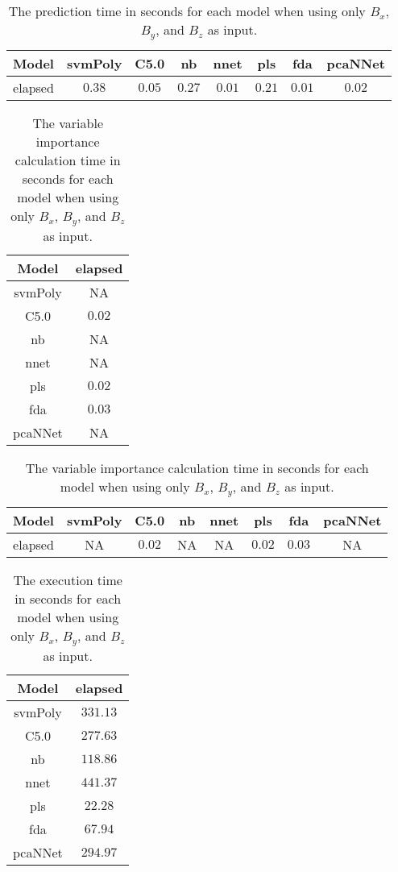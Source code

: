 \begin{table}[!ht]
	\centering
	\begin{tabular}{|c|c|c|c|c|c|c|c|}
		\hline
		Model & svmPoly & C5.0 & nb & nnet & pls & fda & pcaNNet \\ \hline
		elapsed & $0.38$ & $0.05$ & $0.27$ & $0.01$ & $0.21$ & $0.01$ & $0.02$ \\ \hline
	\end{tabular}
	\caption{The prediction time in seconds for each model when using only $B_{x}$, $B_{y}$, and $B_{z}$ as input.}
	\label{tab:time:reverse:coord:predict}
\end{table}

\begin{table}[!ht]
	\centering
	\begin{tabular}{|c|c|}
		\hline
		Model & elapsed \\ \hline
		svmPoly & NA \\ \hline
		C5.0 & $0.02$ \\ \hline
		nb & NA \\ \hline
		nnet & NA \\ \hline
		pls & $0.02$ \\ \hline
		fda & $0.03$ \\ \hline
		pcaNNet & NA \\ \hline
	\end{tabular}
	\caption{The variable importance calculation time in seconds for each model when using only $B_{x}$, $B_{y}$, and $B_{z}$ as input.}
	\label{tab:time:coord:importance}
\end{table}

\begin{table}[!ht]
	\centering
	\begin{tabular}{|c|c|c|c|c|c|c|c|}
		\hline
		Model & svmPoly & C5.0 & nb & nnet & pls & fda & pcaNNet \\ \hline
		elapsed & NA & $0.02$ & NA & NA & $0.02$ & $0.03$ & NA \\ \hline
	\end{tabular}
	\caption{The variable importance calculation time in seconds for each model when using only $B_{x}$, $B_{y}$, and $B_{z}$ as input.}
	\label{tab:time:reverse:coord:importance}
\end{table}

\begin{table}[!ht]
	\centering
	\begin{tabular}{|c|c|}
		\hline
		Model & elapsed \\ \hline
		svmPoly & $331.13$ \\ \hline
		C5.0 & $277.63$ \\ \hline
		nb & $118.86$ \\ \hline
		nnet & $441.37$ \\ \hline
		pls & $22.28$ \\ \hline
		fda & $67.94$ \\ \hline
		pcaNNet & $294.97$ \\ \hline
	\end{tabular}
	\caption{The execution time in seconds for each model when using only $B_{x}$, $B_{y}$, and $B_{z}$ as input.}
	\label{tab:time:coord:total}
\end{table}

